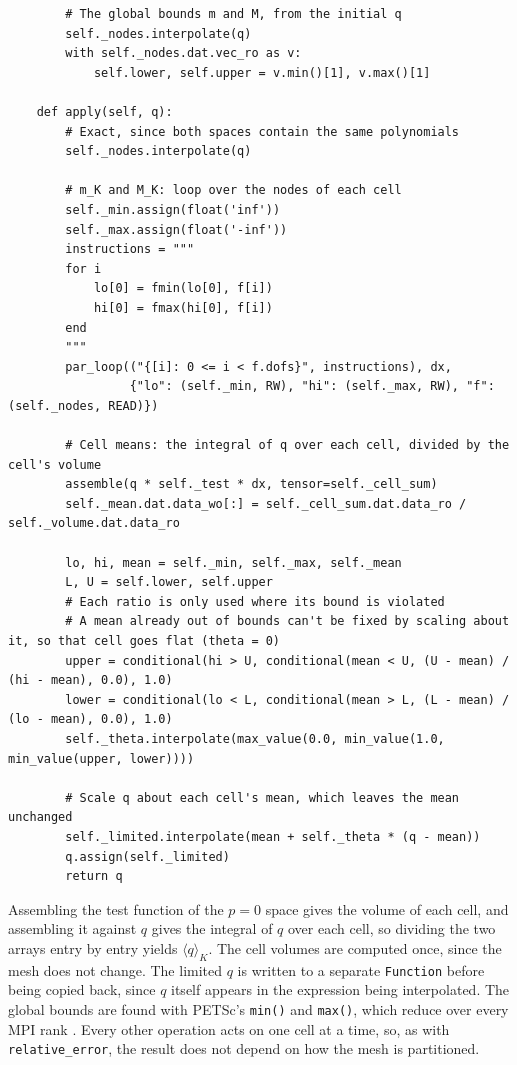 \documentclass{article}
\begin{document}
\begin{appendices}
\begin{verbatim}
        # The global bounds m and M, from the initial q
        self._nodes.interpolate(q)
        with self._nodes.dat.vec_ro as v:
            self.lower, self.upper = v.min()[1], v.max()[1]

    def apply(self, q):
        # Exact, since both spaces contain the same polynomials
        self._nodes.interpolate(q)

        # m_K and M_K: loop over the nodes of each cell
        self._min.assign(float('inf'))
        self._max.assign(float('-inf'))
        instructions = """
        for i
            lo[0] = fmin(lo[0], f[i])
            hi[0] = fmax(hi[0], f[i])
        end
        """
        par_loop(("{[i]: 0 <= i < f.dofs}", instructions), dx,
                 {"lo": (self._min, RW), "hi": (self._max, RW), "f": (self._nodes, READ)})

        # Cell means: the integral of q over each cell, divided by the cell's volume
        assemble(q * self._test * dx, tensor=self._cell_sum)
        self._mean.dat.data_wo[:] = self._cell_sum.dat.data_ro / self._volume.dat.data_ro

        lo, hi, mean = self._min, self._max, self._mean
        L, U = self.lower, self.upper
        # Each ratio is only used where its bound is violated
        # A mean already out of bounds can't be fixed by scaling about it, so that cell goes flat (theta = 0)
        upper = conditional(hi > U, conditional(mean < U, (U - mean) / (hi - mean), 0.0), 1.0)
        lower = conditional(lo < L, conditional(mean > L, (L - mean) / (lo - mean), 0.0), 1.0)
        self._theta.interpolate(max_value(0.0, min_value(1.0, min_value(upper, lower))))

        # Scale q about each cell's mean, which leaves the mean unchanged
        self._limited.interpolate(mean + self._theta * (q - mean))
        q.assign(self._limited)
        return q
\end{verbatim}

Assembling the test function of the $p = 0$ space gives the volume of each cell, and assembling it against $q$ gives the integral of $q$ over each cell, so dividing the two arrays entry by entry yields $\langle q \rangle_K$.
The cell volumes are computed once, since the mesh does not change.
The limited $q$ is written to a separate \texttt{Function} before being copied back, since $q$ itself appears in the expression being interpolated.
The global bounds are found with PETSc's \texttt{min()} and \texttt{max()}, which reduce over every MPI rank \cite{PETScUserManual, Dalcin2011}.
Every other operation acts on one cell at a time, so, as with \texttt{relative_error}, the result does not depend on how the mesh is partitioned.


\end{appendices}
\end{document}
